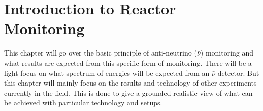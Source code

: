 
\ifpdf
    \graphicspath{{Chapter1/Figs/Raster/}{Chapter1/Figs/PDF/}{Chapter1/Figs/}}
\else
    \graphicspath{{Chapter1/Figs/Vector/}{Chapter1/Figs/}}
\fi

\chapter{Introduction to Reactor Monitoring} \label{Chap:theAimOfVidarr} %
This chapter will go over the basic principle of anti-neutrino ($\bar{\nu}$) monitoring and what results are expected from this specific form of monitoring. There will be a light focus on what spectrum of energies will be expected from an $\bar{\nu}$ detector. But this chapter will mainly focus on the results and technology of other experiments currently in the field. This is done to give a grounded realistic view of what can be achieved with particular technology and setups. 

